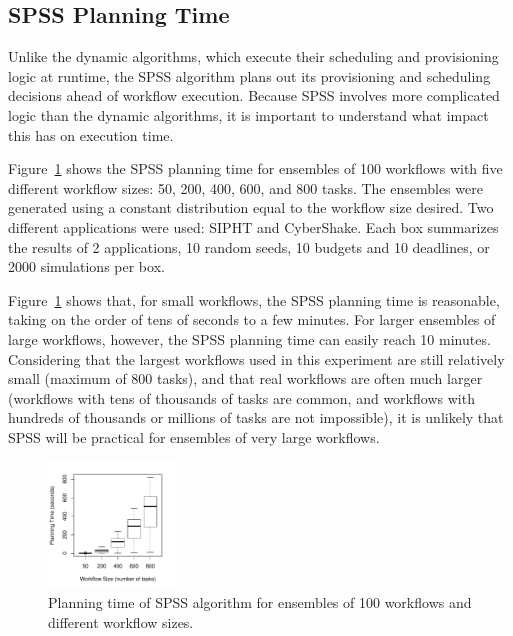 \documentclass[conference]{IEEEtran}
\begin{document}
\subsection{SPSS Planning Time}

Unlike the dynamic algorithms, which execute their scheduling and provisioning logic at runtime, the SPSS algorithm plans out its provisioning and scheduling decisions ahead of workflow execution. Because SPSS involves more complicated logic than the dynamic algorithms, it is important to understand what impact this has on execution time.

Figure~\ref{fig:spss_planning_time} shows the SPSS planning time for ensembles of 100 workflows with five different workflow sizes: 50, 200, 400, 600, and 800 tasks. The ensembles were generated using a constant distribution equal to the workflow size desired. Two different applications were used: SIPHT and CyberShake. Each box summarizes the results of 2 applications, 10 random seeds, 10 budgets and 10 deadlines, or 2000 simulations per box.

Figure~\ref{fig:spss_planning_time} shows that, for small workflows, the SPSS planning time is reasonable, taking on the order of tens of seconds to a few minutes. For larger ensembles of large workflows, however, the SPSS planning time can easily reach 10 minutes. Considering that the largest workflows used in this experiment are still relatively small (maximum of 800 tasks), and that real workflows are often much larger (workflows with tens of thousands of tasks are common, and workflows with hundreds of thousands or millions of tasks are not impossible), it is unlikely that SPSS will be practical for ensembles of very large workflows.

\begin{figure}[tb]
    \centering
    \includegraphics[width=0.3\textwidth]{spss_planning_time}
    \caption{Planning time of SPSS algorithm for ensembles of 100 workflows and different workflow sizes.}
    \label{fig:spss_planning_time}
\end{figure}
\end{document}
